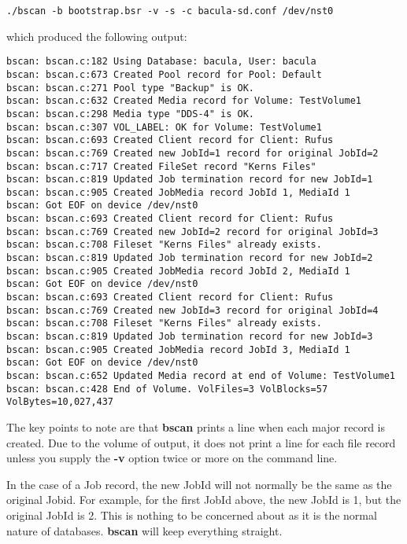 \footnotesize
\begin{verbatim}
./bscan -b bootstrap.bsr -v -s -c bacula-sd.conf /dev/nst0
\end{verbatim}
\normalsize

which produced the following output: 

\footnotesize
\begin{verbatim}
bscan: bscan.c:182 Using Database: bacula, User: bacula
bscan: bscan.c:673 Created Pool record for Pool: Default
bscan: bscan.c:271 Pool type "Backup" is OK.
bscan: bscan.c:632 Created Media record for Volume: TestVolume1
bscan: bscan.c:298 Media type "DDS-4" is OK.
bscan: bscan.c:307 VOL_LABEL: OK for Volume: TestVolume1
bscan: bscan.c:693 Created Client record for Client: Rufus
bscan: bscan.c:769 Created new JobId=1 record for original JobId=2
bscan: bscan.c:717 Created FileSet record "Kerns Files"
bscan: bscan.c:819 Updated Job termination record for new JobId=1
bscan: bscan.c:905 Created JobMedia record JobId 1, MediaId 1
bscan: Got EOF on device /dev/nst0
bscan: bscan.c:693 Created Client record for Client: Rufus
bscan: bscan.c:769 Created new JobId=2 record for original JobId=3
bscan: bscan.c:708 Fileset "Kerns Files" already exists.
bscan: bscan.c:819 Updated Job termination record for new JobId=2
bscan: bscan.c:905 Created JobMedia record JobId 2, MediaId 1
bscan: Got EOF on device /dev/nst0
bscan: bscan.c:693 Created Client record for Client: Rufus
bscan: bscan.c:769 Created new JobId=3 record for original JobId=4
bscan: bscan.c:708 Fileset "Kerns Files" already exists.
bscan: bscan.c:819 Updated Job termination record for new JobId=3
bscan: bscan.c:905 Created JobMedia record JobId 3, MediaId 1
bscan: Got EOF on device /dev/nst0
bscan: bscan.c:652 Updated Media record at end of Volume: TestVolume1
bscan: bscan.c:428 End of Volume. VolFiles=3 VolBlocks=57 VolBytes=10,027,437
\end{verbatim}
\normalsize

The key points to note are that {\bf bscan} prints a line when each major
record is created. Due to the volume of output, it does not print a line for
each file record unless you supply the {\bf -v} option twice or more on the
command line. 

In the case of a Job record, the new JobId will not normally be the same as
the original Jobid. For example, for the first JobId above, the new JobId is
1, but the original JobId is 2. This is nothing to be concerned about as it is
the normal nature of databases. {\bf bscan} will keep everything straight. 

